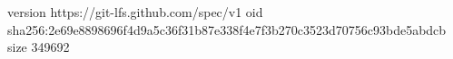 version https://git-lfs.github.com/spec/v1
oid sha256:2e69e8898696f4d9a5c36f31b87e338f4e7f3b270c3523d70756c93bde5abdcb
size 349692
